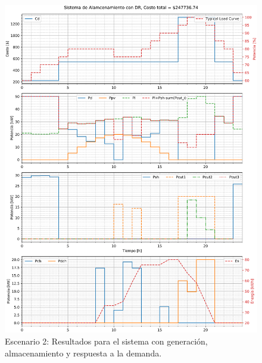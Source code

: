 \begin{figure}
	\centering
	\includegraphics[width=16cm]{img/escenario2.eps}
	\caption{Escenario 2: Resultados para el sistema con generación, almacenamiento y respuesta a la demanda.}
	\label{fig:escenario2}
\end{figure}
